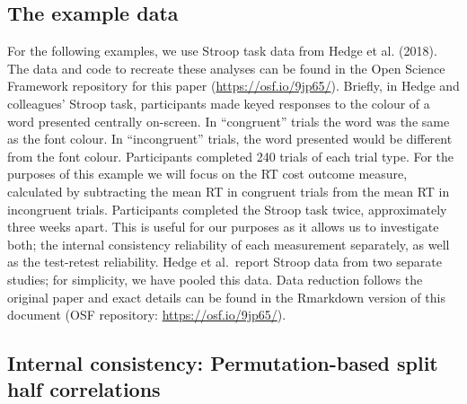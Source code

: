 \documentclass[english,,man,floatsintext]{apa6}
\begin{document}
\hypertarget{the-example-data}{%
\subsection{The example data}\label{the-example-data}}

For the following examples, we use Stroop task data from Hedge et al. (2018). The data and code to recreate these analyses can be found in the Open Science Framework repository for this paper (\url{https://osf.io/9jp65/}). Briefly, in Hedge and colleagues' Stroop task, participants made keyed responses to the colour of a word presented centrally on-screen. In \enquote{congruent} trials the word was the same as the font colour. In \enquote{incongruent} trials, the word presented would be different from the font colour. Participants completed 240 trials of each trial type. For the purposes of this example we will focus on the RT cost outcome measure, calculated by subtracting the mean RT in congruent trials from the mean RT in incongruent trials. Participants completed the Stroop task twice, approximately three weeks apart. This is useful for our purposes as it allows us to investigate both; the internal consistency reliability of each measurement separately, as well as the test-retest reliability. Hedge et al.~report Stroop data from two separate studies; for simplicity, we have pooled this data. Data reduction follows the original paper and exact details can be found in the Rmarkdown version of this document (OSF repository: \url{https://osf.io/9jp65/}).

\hypertarget{internal-consistency-permutation-based-split-half-correlations}{%
\subsection{Internal consistency: Permutation-based split half correlations}\label{internal-consistency-permutation-based-split-half-correlations}}
\end{document}
